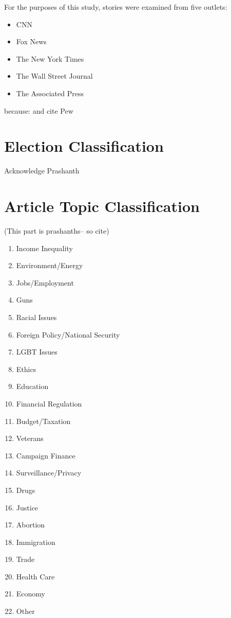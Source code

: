 For the purposes of this study, stories were examined from five outlets: 

\begin{itemize}
  \item CNN
  \item Fox News  
  \item The New York Times
  \item The Wall Street Journal
  \item The Associated Press 
\end{itemize}

because:   
and cite Pew

\section{Election Classification}

Acknowledge Prashanth

\section{Article Topic Classification}
(This part is prashanths-- so cite)
 


\begin{enumerate}
  \item Income Inequality
  \item Environment/Energy
  \item Jobs/Employment
  \item Guns
  \item Racial Issues
  \item Foreign Policy/National Security
  \item LGBT Issues
  \item Ethics
  \item Education
  \item Financial Regulation
  \item Budget/Taxation
  \item Veterans
  \item Campaign Finance
  \item Surveillance/Privacy
  \item Drugs
  \item Justice
  \item Abortion
  \item Immigration
  \item Trade
  \item Health Care
  \item Economy
  \item Other 
\end{enumerate}
 



